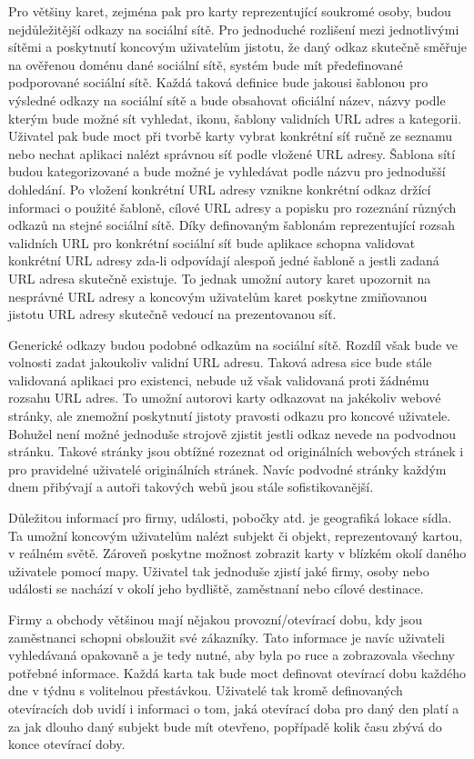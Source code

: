 \begin{itemize}
\begin{itemize}
	Pro většiny karet, zejména pak pro karty reprezentující soukromé osoby, budou nejdůležitější odkazy na sociální sítě.
	Pro jednoduché rozlišení mezi jednotlivými sítěmi a poskytnutí koncovým uživatelům jistotu, že daný odkaz skutečně
	směřuje na ověřenou doménu dané sociální sítě, systém bude mít předefinované podporované sociální sítě.
	Každá taková definice bude jakousi šablonou pro výsledné odkazy na sociální sítě a bude obsahovat oficiální název,
	názvy podle kterým bude možné sít vyhledat, ikonu, šablony validních URL adres a kategorii.
	Uživatel pak bude moct při tvorbě karty vybrat konkrétní síť ručně ze seznamu nebo nechat aplikaci nalézt správnou
	síť podle vložené URL adresy.
	Šablona sítí budou kategorizované a bude možné je vyhledávat podle názvu pro jednodušší dohledání.
	Po vložení konkrétní URL adresy vznikne konkrétní odkaz držící informaci o použité šabloně, cílové URL adresy a
	popisku pro rozeznání různých odkazů na stejné sociální sítě.
	Díky definovaným šablonám reprezentující rozsah validních URL pro konkrétní sociální síť bude aplikace schopna
	validovat konkrétní URL adresy zda-li odpovídají alespoň jedné šabloně a jestli zadaná URL adresa skutečně existuje.
	To jednak umožní autory karet upozornit na nesprávné URL adresy a koncovým uživatelům karet poskytne zmiňovanou jistotu
	URL adresy skutečně vedoucí na prezentovanou síť.

	Generické odkazy budou podobné odkazům na sociální sítě.
	Rozdíl však bude ve volnosti zadat jakoukoliv validní URL adresu.
	Taková adresa sice bude stále validovaná aplikaci pro existenci, nebude už však validovaná proti žádnému rozsahu
	URL adres.
	To umožní autorovi karty odkazovat na jakékoliv webové stránky, ale znemožní poskytnutí jistoty pravosti odkazu
	pro koncové uživatele.
	Bohužel není možné jednoduše strojově zjistit jestli odkaz nevede na podvodnou stránku.
	Takové stránky jsou obtížné rozeznat od originálních webových stránek i pro pravidelné uživatelé originálních stránek.
	Navíc podvodné stránky každým dnem přibývají a autoři takových webů jsou stále sofistikovanější.

	Důležitou informací pro firmy, události, pobočky atd. je geografiká lokace sídla.
	Ta umožní koncovým uživatelům nalézt subjekt či objekt, reprezentovaný kartou, v reálném světě.
	Zároveň poskytne možnost zobrazit karty v blízkém okolí daného uživatele pomocí mapy.
	Uživatel tak jednoduše zjistí jaké firmy, osoby nebo události se nachází v okolí jeho bydliště, zaměstnaní nebo
	cílové destinace.

	Firmy a obchody většinou mají nějakou provozní/otevírací dobu, kdy jsou zaměstnanci schopni obsloužit své zákazníky.
	Tato informace je navíc uživateli vyhledávaná opakovaně a je tedy nutné, aby byla po ruce a zobrazovala všechny potřebné
	informace.
	Každá karta tak bude moct definovat otevírací dobu každého dne v týdnu s volitelnou přestávkou.
	Uživatelé tak kromě definovaných otevíracích dob uvidí i informaci o tom, jaká otevírací doba pro daný den platí
	a za jak dlouho daný subjekt bude mít otevřeno, popřípadě kolik času zbývá do konce otevírací doby.


\end{itemize}
\end{itemize}
